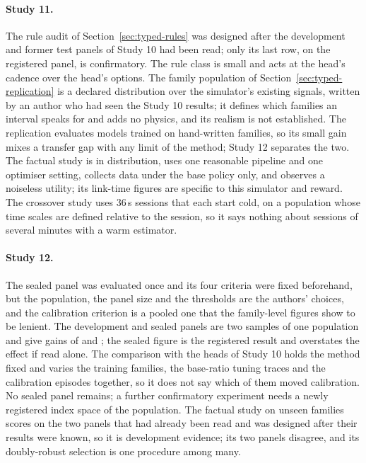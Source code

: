 \documentclass[10pt]{article}
\begin{document}
\paragraph{Study 11.}
The rule audit of Section~\ref{sec:typed-rules} was designed after the development and former test panels of Study 10 had been read; only its last row, on the registered panel, is confirmatory. The rule class is small and acts at the head's cadence over the head's options. The family population of Section~\ref{sec:typed-replication} is a declared distribution over the simulator's existing signals, written by an author who had seen the Study 10 results; it defines which families an interval speaks for and adds no physics, and its realism is not established. The replication evaluates models trained on hand-written families, so its small gain mixes a transfer gap with any limit of the method; Study 12 separates the two. The factual study is in distribution, uses one reasonable pipeline and one optimiser setting, collects data under the base policy only, and observes a noiseless utility; its link-time figures are specific to this simulator and reward. The crossover study uses 36\,s sessions that each start cold, on a population whose time scales are defined relative to the session, so it says nothing about sessions of several minutes with a warm estimator.

\paragraph{Study 12.}
The sealed panel was evaluated once and its four criteria were fixed beforehand, but the population, the panel size and the thresholds are the authors' choices, and the calibration criterion is a pooled one that the family-level figures show to be lenient. The development and sealed panels are two samples of one population and give gains of \TypedPopDevGain{} and \TypedPopGain{}; the sealed figure is the registered result and overstates the effect if read alone. The comparison with the heads of Study 10 holds the method fixed and varies the training families, the base-ratio tuning traces and the calibration episodes together, so it does not say which of them moved calibration. No sealed panel remains; a further confirmatory experiment needs a newly registered index space of the population. The factual study on unseen families scores on the two panels that had already been read and was designed after their results were known, so it is development evidence; its two panels disagree, and its doubly-robust selection is one procedure among many.
\end{document}
